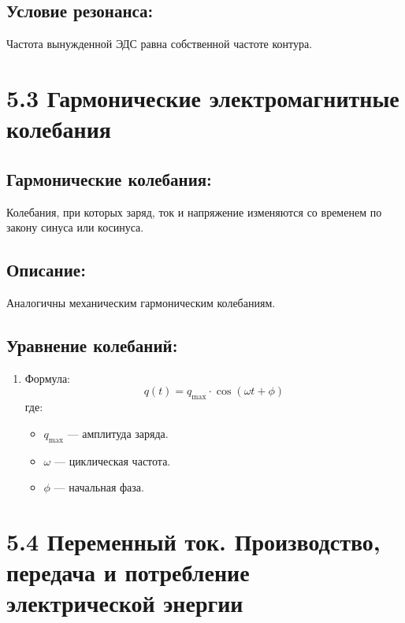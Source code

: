 \documentclass[a4paper,12pt]{article}
\begin{document}
\vspace{-9pt}
\subsection*{Условие резонанса:}
\vspace{-3pt}
Частота вынужденной ЭДС равна собственной частоте контура.

\newpage

\section*{5.3 Гармонические электромагнитные колебания}
\vspace{-9pt}
\subsection*{Гармонические колебания:}
\vspace{-3pt}
Колебания, при которых заряд, ток и напряжение изменяются со временем по закону синуса или косинуса.

\vspace{-9pt}
\subsection*{Описание:}
\vspace{-3pt}
Аналогичны механическим гармоническим колебаниям.

\vspace{-9pt}
\subsection*{Уравнение колебаний:}
\vspace{-3pt}
\begin{enumerate}[itemsep=0pt, topsep=0pt, parsep=3pt]
  \item Формула:
  \vspace{-0.05em}
  $$ q(t) = q_{\text{max}} \cdot \cos(\omega t + \phi) $$
  где:
  \begin{itemize}
    \item $q_{\text{max}}$ — амплитуда заряда.
    \item $\omega$ — циклическая частота.
    \item $\phi$ — начальная фаза.
  \end{itemize}
\end{enumerate}

\section*{5.4 Переменный ток. Производство, передача и потребление электрической энергии}
\vspace{-9pt}
\end{document}
